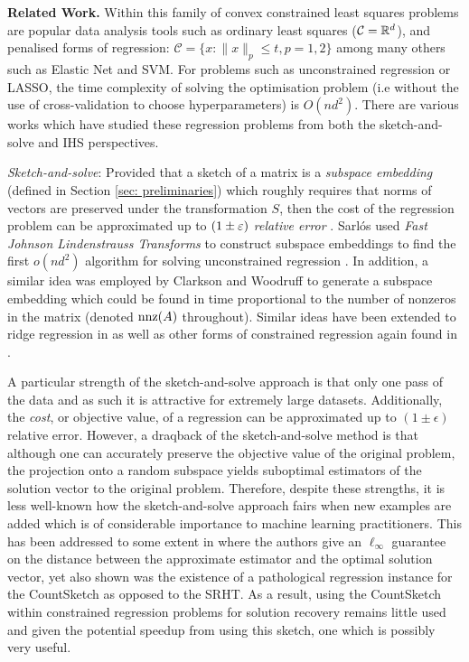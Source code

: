 \textbf{Related Work.}
Within this family of convex constrained least squares problems are popular
data analysis tools such as ordinary least squares ($\mathcal{C} = \mathbb{R}^d$),
and penalised forms of regression: $\mathcal{C} = \{x : \|x\|_p \le t, p=1,2 \}$
among many others such as Elastic Net and SVM.
For problems such as unconstrained regression or LASSO, the time complexity of
solving the optimisation problem (i.e without the use of cross-validation to
choose hyperparameters) is  $O(nd^2)$.
There are various works which have studied these regression problems from both
the sketch-and-solve and IHS perspectives.



\noindent\textit{Sketch-and-solve}:
Provided that a sketch of a matrix is a \textit{subspace embedding} (defined
in Section \ref{sec: preliminaries}) which roughly requires that norms of vectors
are preserved under the transformation $S$, then the cost
of the regression problem can be approximated up to $(1 \pm \varepsilon)$\textit{
relative error} \cite{woodruff2014sketching}.
Sarl\'{o}s used \textit{Fast Johnson Lindenstrauss Transforms}
to construct subspace embeddings to find
the first $o(nd^2)$ algorithm for solving unconstrained regression
 \cite{sarlos2006improved}.
 In addition, a similar idea was employed by Clarkson and Woodruff
\cite{clarkson2013low} to
generate a subspace embedding which could be found in time proportional to the
number of nonzeros in the matrix (denoted $\text{nnz}(A)$ throughout).
Similar ideas have been extended to ridge regression in
\cite{avron2016sharper} as well as other forms of constrained regression again
found in \cite{woodruff2014sketching}.

A particular strength of the sketch-and-solve approach is that only one pass
of the data and
as such it is attractive for extremely large datasets.
Additionally, the \textit{cost}, or objective value, of a regression can be
approximated up to $(1 \pm \epsilon)$ relative error.
However, a draqback of the sketch-and-solve method is that although one can
accurately preserve the objective value of the original problem,
the projection onto a random subspace yields suboptimal estimators of the
solution vector to the original problem.
Therefore, despite these strengths, it is less well-known how the
 sketch-and-solve
approach fairs when new examples are added which is of considerable
importance to machine learning practitioners.
This has been addressed to some extent in \cite{price2017fast} where the
authors give an $\ell_{\infty}$ guarantee on the distance between the
approximate estimator and the optimal solution vector, yet also shown
was the existence of a pathological
regression instance for the CountSketch as opposed to the SRHT.
As a result, using the CountSketch within constrained regression problems
for solution recovery remains little used and given the potential speedup
from using this sketch, one which is possibly very useful.


